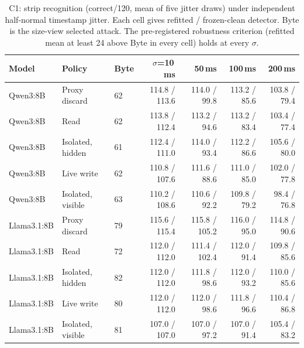 \begin{table}[t]\centering\small
\caption{C1: strip recognition (correct/120, mean of five jitter draws) under independent half-normal timestamp jitter. Each cell gives refitted / frozen-clean detector. Byte is the size-view selected attack. The pre-registered robustness criterion (refitted mean at least 24 above Byte in every cell) holds at every $\sigma$.}\label{tab:c1}
\setlength{\tabcolsep}{4pt}
\begin{tabularx}{\textwidth}{@{}llYrrrr@{}}\toprule
Model & Policy & Byte & $\sigma$=10\,ms & 50\,ms & 100\,ms & 200\,ms\\\midrule
Qwen3:8B & Proxy discard & 62 & 114.8 / 113.6 & 114.0 / 99.8 & 113.2 / 85.6 & 103.8 / 79.4 \\
Qwen3:8B & Read & 62 & 113.8 / 112.4 & 113.2 / 94.6 & 113.2 / 83.4 & 103.4 / 77.4 \\
Qwen3:8B & Isolated, hidden & 61 & 112.4 / 111.0 & 114.0 / 93.4 & 112.2 / 86.6 & 105.6 / 80.0 \\
Qwen3:8B & Live write & 62 & 110.8 / 107.6 & 111.6 / 88.6 & 111.0 / 85.0 & 102.0 / 77.8 \\
Qwen3:8B & Isolated, visible & 63 & 110.2 / 108.6 & 110.6 / 92.2 & 109.8 / 79.2 & 98.4 / 76.8 \\
Llama3.1:8B & Proxy discard & 79 & 115.6 / 115.4 & 115.8 / 105.2 & 116.0 / 95.0 & 114.8 / 90.6 \\
Llama3.1:8B & Read & 72 & 112.0 / 112.0 & 111.4 / 102.4 & 112.0 / 91.4 & 109.8 / 85.6 \\
Llama3.1:8B & Isolated, hidden & 82 & 112.0 / 112.0 & 111.8 / 98.6 & 112.0 / 93.2 & 110.0 / 85.6 \\
Llama3.1:8B & Live write & 80 & 112.0 / 112.0 & 112.0 / 98.6 & 111.8 / 96.6 & 110.4 / 86.8 \\
Llama3.1:8B & Isolated, visible & 81 & 107.0 / 107.0 & 107.0 / 97.2 & 107.0 / 91.4 & 105.4 / 83.2 \\
\bottomrule\end{tabularx}
\end{table}
